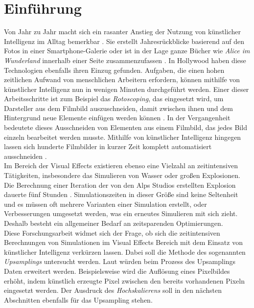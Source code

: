 \chapter{Einführung}
\thispagestyle{fancy}

Von Jahr zu Jahr macht sich ein rasanter Anstieg der Nutzung von künstlicher Intelligenz im Alltag bemerkbar \parencite[]{fraunhofer-allianz-big-data-2017}. Sie erstellt Jahresrückblicke basierend auf den Fotos in einer Smartphone-Galerie \parencite[]{ralf-2022} oder ist in der Lage ganze Bücher wie \textit{Alice im Wunderland} innerhalb einer Seite zusammenzufassen \parencite[]{openai-2022}.
In Hollywood haben diese Technologien ebenfalls ihren Einzug gefunden. Aufgaben, die einen hohen zeitlichen Aufwand von menschlichen Arbeitern erfordern, können mithilfe von künstlicher Intelligenz nun in wenigen Minuten durchgeführt werden. Einer dieser Arbeitsschritte ist zum Beispiel das \textit{Rotoscoping}, das eingesetzt wird, um Darsteller aus dem Filmbild auszuschneiden, damit zwischen ihnen und dem Hintergrund neue Elemente einfügen werden können \parencite[]{dawson-2021}. In der Vergangenheit bedeutete dieses Ausschneiden von Elementen aus einem Filmbild, das jedes Bild einzeln bearbeitet werden musste. Mithilfe von künstlicher Intelligenz hingegen lassen sich hunderte Filmbilder in kurzer Zeit komplett automatisiert ausschneiden \parencite[]{befores-afters-2021}.   \\

Im Bereich der Visual Effects existieren ebenso eine Vielzahl an zeitintensiven Tätigkeiten, insbesondere das Simulieren von Wasser oder großen Explosionen. Die Berechnung einer Iteration der von den Alps Studios erstellten Explosion dauerte fünf Stunden \parencite[]{alps-vfx-2020}. Simulationszeiten in dieser Größe sind keine Seltenheit und es müssen oft mehrere Varianten einer Simulation erstellt, oder Verbesserungen umgesetzt werden, was ein erneutes Simulieren mit sich zieht. Deshalb besteht ein allgemeiner Bedarf an zeitsparenden Optimierungen.\\

Diese Forschungsarbeit widmet sich der Frage, ob sich die zeitintensiven Berechnungen von Simulationen im Visual Effects Bereich mit dem Einsatz von künstlicher Intelligenz verkürzen lassen. Dabei soll die Methode des sogenannten \textit{Upsamplings} untersucht werden. Laut \citet[]{chaubey-2021} würden beim Prozess des Upsamplings Daten erweitert werden. Beispielsweise wird die Auflösung eines Pixelbildes erhöht, indem künstlich erzeugte Pixel zwischen den bereits vorhandenen Pixeln eingesetzt werden. Der Ausdruck des \textit{Hochskalierens} soll in den nächsten Abschnitten ebenfalls für das Upsampling stehen.\\

